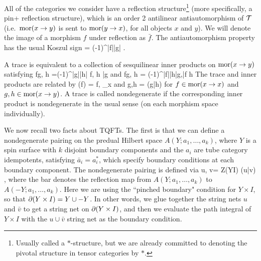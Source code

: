 All of the categories we consider have a reflection structure\footnote{Usually called a $*$-structure,
but we are already committed to denoting the pivotal structure in tensor categories by $*$.}
(more specifically, a pin+ reflection structure),
which is an order 2 antilinear antiautomorphism of $\mathcal{T}$
(i.e.\ $\text{mor}(x\to y)$ is sent to $\text{mor}(y\to x)$, for all objects $x$ and $y$).
We will denote the image of a morphism $f$ under reflection as $\bar f$.
The antiautomorphism property has the usual Koszul sign
\be
	 = (-1)^{|f||g|}   .
\ee

A trace is equivalent to a collection of sesquilinear inner products on $\text{mor}(x\to y)$ satisfying
\be
	\langle fg, h \rangle =(-1)^{|g||h|} \langle f, h \bar{g} \rangle \;\;\; {\rm and} \;\;\; \langle fg, h \rangle = (-1)^{|f||h|}\langle g,\bar{f}  h  \rangle 
\ee
The trace and inner products are related by
\be
\label{trace_to_innerproduct}
	\tr(f) = \langle f, \id_x \rangle   \;\;\; {\rm and} \;\;\;   \langle g,h \rangle = \tr(g\bar{h})
\ee
for $f\in\text{mor}(x\to x)$ and  $g,h\in\text{mor}(x\to y)$.
A trace is called nondegenerate if the corresponding inner product is nondegenerate in the usual sense (on each morphism space individually).

\medskip

We now recall two facts about TQFTs.
The first is that we can define a nondegenerate pairing on the predual Hilbert
space $A(Y; a_1,\ldots,a_k)$, where $Y$ is a spin surface with $k$ disjoint boundary components 
and the $a_i$ are tube category idempotents, satisfying
$\bar a_i = a^*_i$, which specify boundary conditions at each boundary component.
The nondegenerate pairing is defined via
\be
	\langle u, v\rangle = Z(Y\times I) (u\cup \bar v) ,
\ee
where the bar denotes the reflection map from 
$A(Y; a_1,\ldots,a_k)$ to $A(-Y; a_1,\ldots,a_k)$.
Here we are using the ``pinched boundary" condition for $Y\times I$, so that $\partial (Y\times I) = Y\cup -Y$.
In other words, we glue together the string nets $u$ and $\bar v$ to get a string net on $\partial (Y\times I)$, and then we evaluate
the path integral of $Y\times I$ with the $u\cup \bar v$ string net as the boundary condition.

